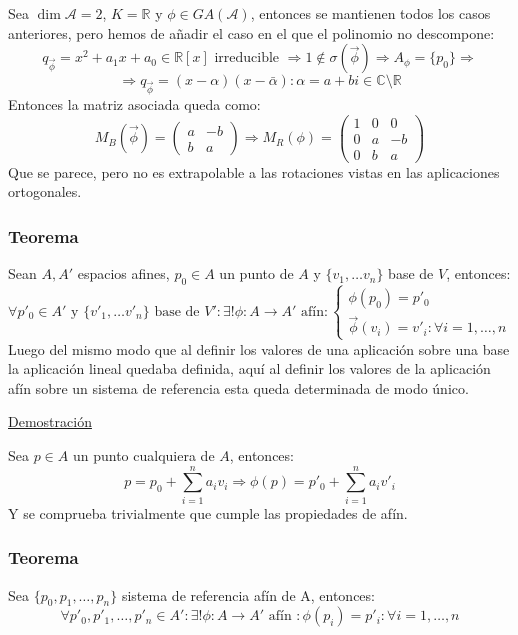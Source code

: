 \documentclass[10pt,a4paper,openright]{book}
\theoremstyle{break}
\begin{document}
Sea $\dim \mathcal{A} = 2$, $K = \mathbb{R}$ y $\phi \in GA(\mathcal{A})$, entonces se mantienen todos los casos anteriores, pero hemos de añadir el caso en el que el polinomio no descompone:
$$q_{\vec{\phi}} = x^2 + a_1x + a_0 \in \mathbb{R}[x] \mbox{ irreducible } \Rightarrow 1 \notin \sigma(\vec{\phi}) \Rightarrow A_\phi = \{p_0\} \Rightarrow$$
$$ \Rightarrow q_{\vec{\phi}} = (x- \alpha)(x - \bar{\alpha}) : \alpha = a + bi \in \mathbb{C} \setminus \mathbb{R}$$
Entonces la matriz asociada queda como:
$$M_B (\vec{\phi}) = \begin{pmatrix}
a & -b \\ b & a
\end{pmatrix}\Rightarrow M_R (\phi) =  \left(\begin{array}{c|cc}
1  & 0 & 0 \\
\hline
0 & a &  -b \\
0 & b &  a
\end{array}
\right)$$
Que se parece, pero no es extrapolable a las rotaciones vistas en las aplicaciones ortogonales.

\subsubsection*{Teorema}
Sean $A, A'$ espacios afines, $p_0 \in A$ un punto de $A$ y $\{v_1, \ldots v_n\}$ base de $V$, entonces:
$$\forall p'_0 \in A' \mbox{ y }\{v'_1, \ldots v'_n\} \mbox{ base de }V':\exists ! \phi: A \to A'\mbox{ afín}: \begin{cases} \phi(p_0) = p'_0 \\ \vec{\phi} (v_i) = v'_i : \forall i = 1, \ldots, n \end{cases}$$
Luego del mismo modo que al definir los valores de una aplicación sobre una base la aplicación lineal quedaba definida, aquí al definir los valores de la aplicación afín sobre un sistema de referencia esta queda determinada de modo único.

\underline{Demostración}

Sea $p \in A $ un punto cualquiera de $A$, entonces:
$$p = p_0 + \sum_{i=1}^{n} a_i v_i \Rightarrow  \phi(p) = p'_0 + \sum_{i=1}^{n} a_i v'_i $$
Y se comprueba trivialmente que cumple las propiedades de afín.

\subsubsection*{Teorema}
Sea $\{p_0, p_1, \ldots, p_n\}$ sistema de referencia afín de A, entonces:
$$\forall p'_0, p'_1, \ldots, p'_n \in A': \exists! \phi: A \to A' \mbox{ afín }:\phi (p_i) = p'_i : \forall i = 1, \ldots, n$$
\end{document}
